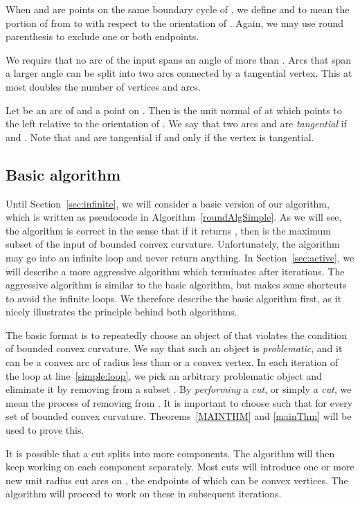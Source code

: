 \documentclass{article}
\begin{document}
When  and  are points on the same boundary cycle  of , we define  and  to mean the portion of  from  to  with respect to the orientation of .
Again, we may use round parenthesis to exclude one or both endpoints.

We require that no arc of the input  spans an angle of more than .
Arcs that span a larger angle can be split into two arcs connected by a tangential vertex.
This at most doubles the number of vertices and arcs.

Let  be an arc of  and  a point on . Then
 is the unit normal of  at  which points to the left
relative to the orientation of .
We say that two arcs  and  are \emph{tangential} if
 and
.
Note that  and  are tangential if and only if
the vertex  is tangential.

\subsection{Basic algorithm}

Until Section~\ref{sec:infinite}, we will consider a basic version of our algorithm, which is written as pseudocode in Algorithm~\ref{roundAlgSimple}.
As we will see, the algorithm is correct in the sense that if it returns , then  is the maximum subset of the input  of bounded convex curvature.
Unfortunately, the algorithm may go into an infinite loop and never return anything.
In Section~\ref{sec:active}, we will describe a more aggressive algorithm which terminates after  iterations.
The aggressive algorithm is similar to the basic algorithm, but makes some shortcuts to avoid the infinite loops.
We therefore describe the basic algorithm first, as it nicely illustrates the principle behind both algorithms.

The basic format is to repeatedly choose an object  of  that violates the condition of bounded convex curvature.
We say that such an object  is \emph{problematic}, and it can be a convex arc of radius less than  or a convex vertex. 
In each iteration of the loop at line~\ref{simple:loop}, we pick an arbitrary problematic object  and eliminate it by removing from  a subset .
By \emph{performing} a \emph{cut}, or simply a \emph{cut}, we mean the process of removing  from .
It is important to choose  such that  for every set  of bounded convex curvature.
Theorems~\ref{MAINTHM} and \ref{mainThm} will be used to prove this.

It is possible that a cut splits  into more components.
The algorithm will then keep working on each component separately.
Most cuts will introduce one or more new unit radius cut arcs on , the endpoints of which can be convex vertices.
The algorithm will proceed to work on these in subsequent iterations.
\end{document}

